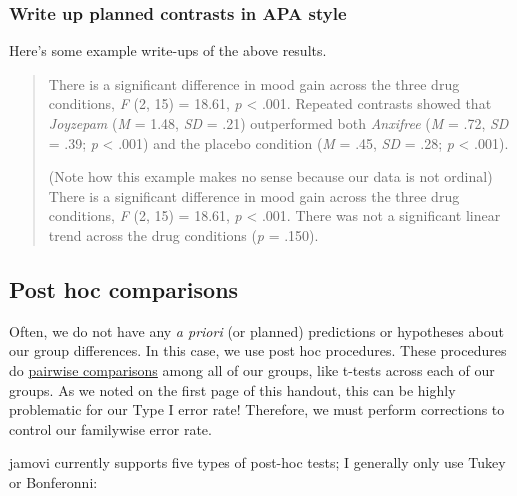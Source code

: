 \documentclass[
]{book}
\begin{document}
\hypertarget{write-up-planned-contrasts-in-apa-style}{%
\subsubsection{Write up planned contrasts in APA style}\label{write-up-planned-contrasts-in-apa-style}}

Here's some example write-ups of the above results.

\begin{quote}
There is a significant difference in mood gain across the three drug conditions, \emph{F} (2, 15) = 18.61, \emph{p} \textless{} .001. Repeated contrasts showed that \emph{Joyzepam} (\emph{M} = 1.48, \emph{SD} = .21) outperformed both \emph{Anxifree} (\emph{M} = .72, \emph{SD} = .39; \emph{p} \textless{} .001) and the placebo condition (\emph{M} = .45, \emph{SD} = .28; \emph{p} \textless{} .001).

(Note how this example makes no sense because our data is not ordinal) There is a significant difference in mood gain across the three drug conditions, \emph{F} (2, 15) = 18.61, \emph{p} \textless{} .001. There was not a significant linear trend across the drug conditions (\emph{p} = .150).
\end{quote}

\hypertarget{post-hoc-comparisons}{%
\subsection{Post hoc comparisons}\label{post-hoc-comparisons}}

Often, we do not have any \emph{a priori} (or planned) predictions or hypotheses about our group differences. In this case, we use post hoc procedures. These procedures do \underline{pairwise comparisons} among all of our groups, like t-tests across each of our groups. As we noted on the first page of this handout, this can be highly problematic for our Type I error rate! Therefore, we must perform corrections to control our familywise error rate.

jamovi currently supports five types of post-hoc tests; I generally only use Tukey or Bonferonni:
\end{document}
